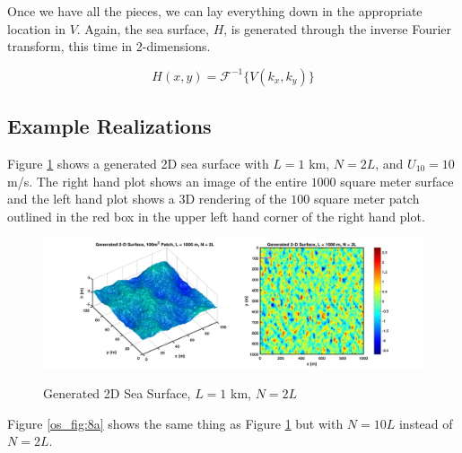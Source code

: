 Once we have all the pieces, we can lay everything down in the appropriate location in $V$. Again, the sea surface, $H$, is generated through the inverse Fourier transform, this time in 2-dimensions.

\begin{equation}
\label{os_eq:12zzz}
H(x,y) = \mathcal{F}^{-1}\{V(k_x,k_y) \}
\end{equation}

\subsection {Example Realizations}
Figure \ref{os_fig:8} shows a generated 2D sea surface with $L = 1$ km, $N = 2L$, and $U_{10} = 10$ m/s. The right hand plot shows an image of the entire $1000$ square meter surface and the left hand plot shows a 3D rendering of the $100$ square meter patch outlined in the red box in the upper left hand corner of the right hand plot.

\begin{figure}[ht]
  \begin{center}
\includegraphics[width=6in]{../media/Ocean_Surface/sea_surface_2d_surf_1000.png}
  \end{center}
  \renewcommand{\baselinestretch}{1} \small\normalsize
  \begin{quote}
    \caption[Generated 2D Sea Surface, $L = 1$ km, $N=2L$]{Generated 2D Sea Surface, $L = 1$ km, $N=2L$ \label{os_fig:8}}
  \end{quote}
\end{figure}
\renewcommand{\baselinestretch}{2} \small\normalsize

Figure \ref{os_fig:8a} shows the same thing as Figure \ref{os_fig:8} but with $N=10L$ instead of $N = 2L$.


